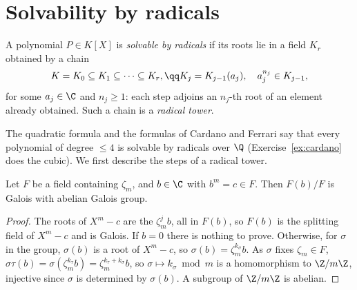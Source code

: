 \section{Solvability by radicals}\label{sec:radicals}

\begin{definition}
A polynomial $P\in K[X]$ is \emph{solvable by radicals} if its roots lie in a field $K_r$ obtained by a chain
\[
\begin{gathered}K=K_0\subseteq K_1\subseteq\dots\subseteq K_r,\qq K_j=K_{j-1}(a_j),\quad a_j^{n_j}\in K_{j-1},\end{gathered}
\]
for some $a_j\in\C$ and $n_j\ge1$: each step adjoins an $n_j$-th root of an element already obtained. Such a chain is a \emph{radical tower}.
\end{definition}

The quadratic formula and the formulas of Cardano and Ferrari say that every polynomial of degree $\le4$ is solvable by radicals over $\Q$ (Exercise~\ref{ex:cardano} does the cubic). We first describe the steps of a radical tower.

\begin{lemma}\label{lem:kummerstep}
Let $F$ be a field containing $\zeta_m$, and $b\in\C$ with $b^m=c\in F$. Then $F(b)/F$ is Galois with abelian Galois group.
\end{lemma}
\begin{proof}
The roots of $X^m-c$ are the $\zeta_m^jb$, all in $F(b)$, so $F(b)$ is the splitting field of $X^m-c$ and is Galois. If $b=0$ there is nothing to prove. Otherwise, for $\sigma$ in the group, $\sigma(b)$ is a root of $X^m-c$, so $\sigma(b)=\zeta_m^{k_\sigma}b$. As $\sigma$ fixes $\zeta_m\in F$, $\sigma\tau(b)=\sigma(\zeta_m^{k_\tau}b)=\zeta_m^{k_\tau+k_\sigma}b$, so $\sigma\mapsto k_\sigma\bmod m$ is a homomorphism to $\Z/m\Z$, injective since $\sigma$ is determined by $\sigma(b)$. A subgroup of $\Z/m\Z$ is abelian.
\end{proof}

